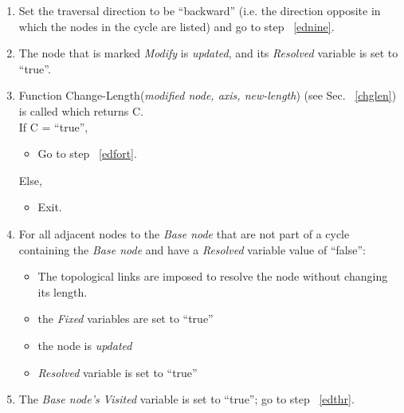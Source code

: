 \begin{enumerate}
	\item
	\label{edelv}
	Set the traversal direction to be ``backward'' (i.e. the direction opposite
	in which the nodes in the cycle are listed) and go to step ~\ref{ednine}.
	\item
	\label{edtw}
	The node that is marked {\em Modify} is {\em updated}, and its
	{\em Resolved} variable is set to ``true''.

	\item
	Function Change-Length({\em modified node, axis, new-length}) 
	(see Sec. ~\ref{chglen}) is called which returns C.\\
    If C = ``true'',
        \begin{itemize}
        \item
		Go to step ~\ref{edfort}.
        \end{itemize}
    Else,
        \begin{itemize}
        \item
        Exit.
        \end{itemize}
	\item
	\label{edfort}
	For all adjacent nodes to the {\em Base node} that are not part of a cycle
	containing the {\em Base node} and have a {\em Resolved} variable value
	of ``false'':
		\begin{itemize}
		\item
		The topological links are imposed to resolve the node without
		changing its length.
		\item
		the {\em Fixed} variables are set to ``true''
		\item
		the node is {\em updated}
		\item
		{\em Resolved} variable is set to ``true''
		\end{itemize}
	\item
	\label{stop}
	The {\em Base node's} {\em Visited} variable is set to ``true'';
	go to step ~\ref{edthr}.
	\end{enumerate}

